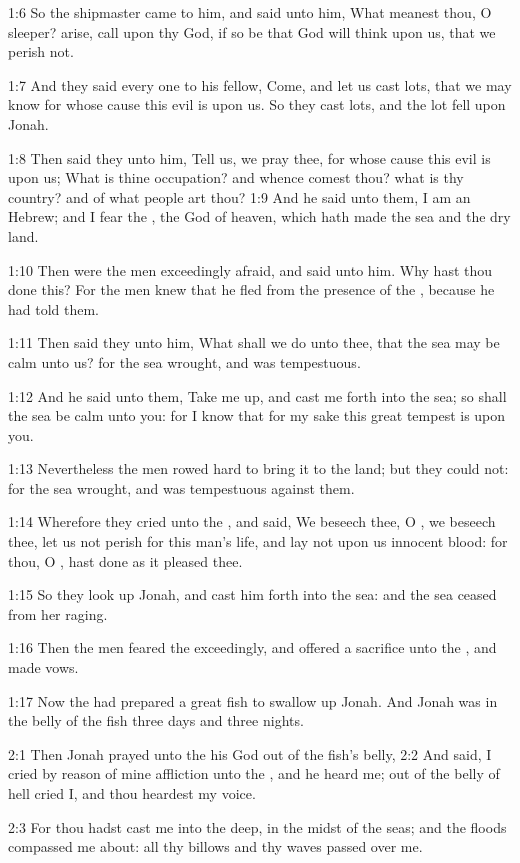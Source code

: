 1:6 So the shipmaster came to him, and said unto him, What meanest
thou, O sleeper? arise, call upon thy God, if so be that God will
think upon us, that we perish not.

1:7 And they said every one to his fellow, Come, and let us cast lots,
that we may know for whose cause this evil is upon us. So they cast
lots, and the lot fell upon Jonah.

1:8 Then said they unto him, Tell us, we pray thee, for whose cause
this evil is upon us; What is thine occupation? and whence comest
thou? what is thy country? and of what people art thou?  1:9 And he
said unto them, I am an Hebrew; and I fear the \LORD, the God of
heaven, which hath made the sea and the dry land.

1:10 Then were the men exceedingly afraid, and said unto him. Why hast
thou done this? For the men knew that he fled from the presence of the
\LORD, because he had told them.

1:11 Then said they unto him, What shall we do unto thee, that the sea
may be calm unto us? for the sea wrought, and was tempestuous.

1:12 And he said unto them, Take me up, and cast me forth into the
sea; so shall the sea be calm unto you: for I know that for my sake
this great tempest is upon you.

1:13 Nevertheless the men rowed hard to bring it to the land; but they
could not: for the sea wrought, and was tempestuous against them.

1:14 Wherefore they cried unto the \LORD, and said, We beseech thee, O
\LORD, we beseech thee, let us not perish for this man's life, and lay
not upon us innocent blood: for thou, O \LORD, hast done as it pleased
thee.

1:15 So they look up Jonah, and cast him forth into the sea: and the
sea ceased from her raging.

1:16 Then the men feared the \LORD exceedingly, and offered a sacrifice
unto the \LORD, and made vows.

1:17 Now the \LORD had prepared a great fish to swallow up Jonah. And
Jonah was in the belly of the fish three days and three nights.

2:1 Then Jonah prayed unto the \LORD his God out of the fish's belly,
2:2 And said, I cried by reason of mine affliction unto the \LORD, and
he heard me; out of the belly of hell cried I, and thou heardest my
voice.

2:3 For thou hadst cast me into the deep, in the midst of the seas;
and the floods compassed me about: all thy billows and thy waves
passed over me.

